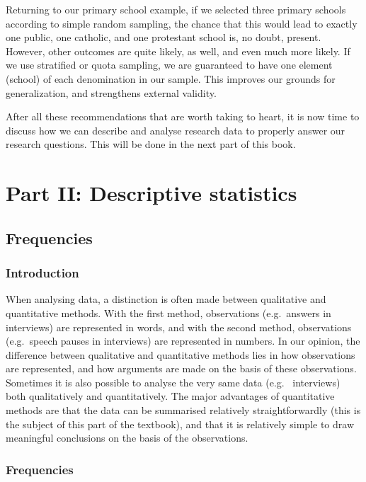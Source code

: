 \documentclass[
]{book}
\begin{document}
Returning to our primary school example, if we selected three primary schools according to simple random sampling, the chance that this would lead to exactly one public, one catholic, and one protestant school is, no doubt, present. However, other outcomes are quite likely, as well, and even much more likely. If we use stratified or quota sampling, we are guaranteed to have one element (school) of each denomination in our sample. This improves our grounds for generalization, and strengthens external validity.

After all these recommendations that are worth taking to heart, it is now time to discuss how we can describe and analyse research data to properly answer our research questions. This will be done in the next part of this book.

\part*{Part II: Descriptive statistics}\label{part-part-ii-descriptive-statistics}

\chapter{Frequencies}\label{ch-frequencies}

\section{Introduction}\label{introduction-3}

When analysing data, a distinction is often made between
qualitative and quantitative methods. With the first method,
observations (e.g.~answers in interviews) are represented in
words, and with the second method, observations (e.g.~speech
pauses in interviews) are represented in numbers. In our opinion,
the difference between qualitative and quantitative methods
lies in how observations are represented, and
how arguments are made on the basis of these observations.
Sometimes it is also possible to analyse the very same data (e.g.~
interviews) both qualitatively and quantitatively. The major
advantages of quantitative methods are that the data can be summarised
relatively straightforwardly (this is the subject of this part of the
textbook), and that it is relatively simple to draw meaningful conclusions
on the basis of the observations.

\section{Frequencies}\label{sec:frequencies}
\end{document}
